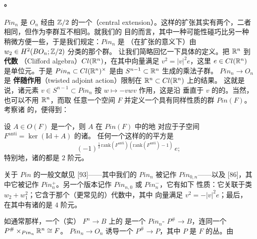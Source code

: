 \paragraph{\trPinStructure。}\label{sub:pin-structures}
$Pin_n$ 是 $O_n$ 经由 $\mathbb{Z}/2$ 的一个\textbf{\trCentralExtension}（central
extension）。这样的扩张其实有两个，二者\trTopology{}相同，但作为李群互不相同。就我们的
目的而言，其中一种可能性碰巧比另一种稍微方便一些，于是我们规定：$Pin_n$ 是
（在\trTopologicalGroup{}扩张的意义下）由 $w_2\in H^2(BO_n;\mathbb{Z}/2)$ 分类的那个群。
让我们简略回忆一下具体的定义。把 $\mathbb{R}^n$ \trEmbedding{}到\textbf{\trClifford{}代数}
（Clifford algebra）$Cl(\mathbb{R}^n)$，在其中向量满足 $v^2=|v|^2e$，这里
$e\in Cl(\mathbb{R}^n)$ 是单位元。于是 $Pin_n\subset Cl(\mathbb{R}^n)^\times$ 是由
$S^{n-1}\subset\mathbb{R}^n$ 生成的乘法子群。\trHomomorphism{} $Pin_n\to O_n$ 是\textbf{\trTwisted
{}伴随作用}（twisted adjoint action）限制在 $\mathbb{R}^n\subset Cl(\mathbb{R}^n)$ 上的结果。
这就是说，诸元素 $v\in S^{n-1}\subset Pin_n$ 按 $w\mapsto -vwv$ 作用，这是沿
垂直于 $v$ 的\trHypersurface{}的\trReflection。当然，也可以不用 $\mathbb{R}^n$，而取
任意一个\trInnerProduct{}空间 $F$ 并定义一个具有同样性质的群 $Pin(F)$。考察诸%
\trReflection{}的\trComposition，便得到：
\begin{lemma}\label{thm:pin-involution-preimage}
设 $A\in O(F)$ 是一个\trInvolution，则 $A$ 在 $Pin(F)$ 中的\trPreimage{}\trCanonical{}地
对应于子空间 $F^{\mathrm{anti}}=\ker(\mathrm{Id}+A)$ 的诸\trOrientation。
任何一个这样的\trPreimage{}的平方是
\begin{equation}\label{eq:pin-preimage-square}
(-1)^{\frac{1}{2}\,\mathrm{rank}(F^{\mathrm{anti}})
(\mathrm{rank}(F^{\mathrm{anti}})-1)}\,e;
\end{equation}
特别地，诸\trReflection{}的\trPreimage{}都是 $2$ 阶元。
\end{lemma}
\noqed
\begin{remark}\label{thm:pin-references}
关于 $Pin$ 的一般文献见 [93]——其中我们的 $Pin_n$ 被记作 $Pin_{0,n}$——以及
[86]，其中它被记作 $Pin_n^+$。另一个版本记作 $Pin_{n,0}$ 或 $Pin_n^-$，它有如下
性质：它关联于类 $w_2+w_1^2$；它含于那个（更常见的）\trClifford{}代数中，其中
向量满足 $v^2=-|v|^2e$；最后，在其中有诸\trReflection{}的\trPreimage{}是 $4$ 阶元。
\end{remark}
如通常那样，一个（实\trInnerProduct）\trVectorBundle{} $F^n\to B$ 上的%
\trPinStructure{}是一个 $Pin_n$-\trPrincipalBundle{} $P^\#\to B$，连同一个%
\trIsomorphism{} $P^\#\times_{Pin_n}\mathbb{R}^n\cong F$。\trHomomorphism{} $Pin_n\to O_n$ 诱导一个%
\trDoubleCover{} $P^\#\to P$，其中 $P$ 是 $F$ 的\trOrthonormal\trFrame{}丛。由
